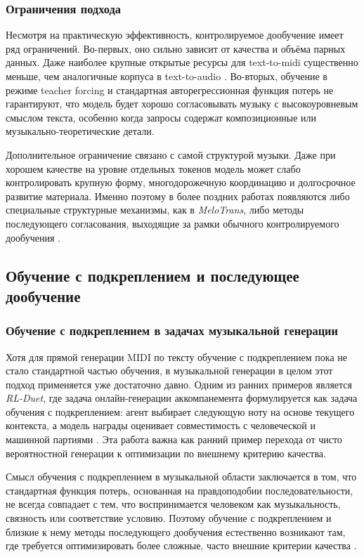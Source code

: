 \documentclass[a4paper,12pt]{extarticle}
\begin{document}
\subsubsection{Ограничения подхода}

Несмотря на практическую эффективность, контролируемое дообучение имеет
ряд ограничений. Во-первых, оно сильно зависит от качества и объёма
парных данных. Даже наиболее крупные открытые ресурсы для text-to-midi
существенно меньше, чем аналогичные корпуса в text-to-audio
\cite{midicaps2024,text2midi2025}. Во-вторых, обучение в режиме
teacher forcing и стандартная авторегрессионная функция потерь не
гарантируют, что модель будет хорошо согласовывать музыку с
высокоуровневым смыслом текста, особенно когда запросы содержат
композиционные или музыкально-теоретические детали.

Дополнительное ограничение связано с самой структурой музыки. Даже при
хорошем качестве на уровне отдельных токенов модель может слабо
контролировать крупную форму, многодорожечную координацию и долгосрочное
развитие материала. Именно поэтому в более поздних работах появляются
либо специальные структурные механизмы, как в \textit{MeloTrans}, либо
методы последующего согласования, выходящие за рамки обычного
контролируемого дообучения
\cite{melotrans2024,text2midiinferalign2025}.


\subsection{Обучение с подкреплением и последующее дообучение}

\subsubsection{Обучение с подкреплением в задачах музыкальной генерации}

Хотя для прямой генерации MIDI по тексту обучение с подкреплением пока не
стало стандартной частью обучения, в музыкальной генерации в целом этот
подход применяется уже достаточно давно. Одним из ранних примеров является
\textit{RL-Duet}, где задача онлайн-генерации аккомпанемента формулируется
как задача обучения с подкреплением: агент выбирает следующую ноту на
основе текущего контекста, а модель награды оценивает совместимость с
человеческой и машинной партиями \cite{rlduet2020}. Эта работа важна как
ранний пример перехода от чисто вероятностной генерации к оптимизации по
внешнему критерию качества.

Смысл обучения с подкреплением в музыкальной области заключается в том,
что стандартная функция потерь, основанная на правдоподобии
последовательности, не всегда совпадает с тем, что воспринимается
человеком как музыкальность, связность или соответствие условию. Поэтому
обучение с подкреплением и близкие к нему методы последующего
дообучения естественно возникают там, где требуется оптимизировать более
сложные, часто внешние критерии качества \cite{musicrl2024,smart2025}.
\end{document}
